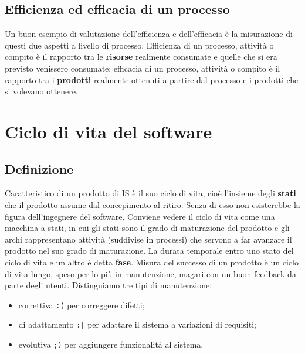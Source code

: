 \documentclass[a4paper]{article}
\begin{document}
		
	\subsection{Efficienza ed efficacia di un processo}

		
Un buon esempio di valutazione dell'efficienza e dell'efficacia è la misurazione di questi due aspetti a livello di processo. Efficienza di un processo, attività o compito è il rapporto tra le \textbf{risorse} realmente consumate e quelle che si era previsto venissero consumate; efficacia di un processo, attività o compito è il rapporto tra i \textbf{prodotti} realmente ottenuti a partire dal processo e i prodotti che si volevano ottenere.
	


		
	\section{Ciclo di vita del software}


		
	\subsection{Definizione}

		
Caratteristico di un prodotto di IS è il suo ciclo di vita, cioè l'insieme degli \textbf{stati} che il prodotto assume dal concepimento al ritiro. Senza di esso non esisterebbe la figura dell'ingegnere del software. Conviene vedere il ciclo di vita come una macchina a stati, in cui gli stati sono il grado di maturazione del prodotto e gli archi rappresentano attività (suddivise in processi) che servono a far avanzare il prodotto nel suo grado di maturazione. La durata temporale entro uno stato del ciclo di vita e un altro è detta \textbf{fase}. Misura del successo di un prodotto è un ciclo di vita lungo, speso per lo più in manutenzione, magari con un buon feedback da parte degli utenti. Distinguiamo tre tipi di manutenzione:
		
	\begin{itemize}
		
			
	\item correttiva  \texttt{:(}  per correggere difetti;
			
	\item di adattamento  \texttt{:|}  per adattare il sistema a variazioni di requisiti;
			
	\item evolutiva  \texttt{;)}  per aggiungere funzionalità al sistema.
		
	\end{itemize}
\end{document}
